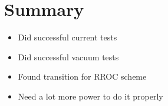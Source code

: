 \section{Summary}

\begin{itemize}
    \item Did successful current tests
    \item Did successful vacuum tests
    \item Found transition for RROC scheme
    \item Need a lot more power to do it properly
\end{itemize}
